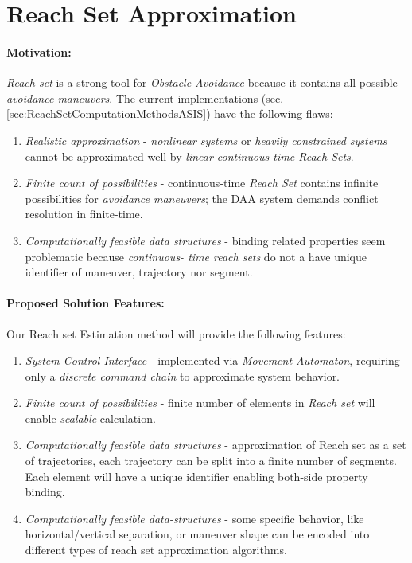 \cleardoublepage
\section{Reach Set Approximation}\label{s:reachSet}

    \noindent\paragraph{Motivation:} \emph{Reach set} is a strong tool for \emph{Obstacle Avoidance} because it contains all possible \emph{avoidance maneuvers}. The current implementations (sec. \ref{sec:ReachSetComputationMethodsASIS}) have the following flaws:
    
    \begin{enumerate}
        \item \emph{Realistic approximation} - \emph{nonlinear systems} or \emph{heavily constrained systems} cannot be approximated well by \emph{linear continuous-time Reach Sets}.
        
        \item \emph{Finite count of possibilities} - continuous-time \emph{Reach Set} contains  infinite possibilities for \emph{avoidance maneuvers}; the DAA system demands conflict resolution in finite-time.
        
        \item \emph{Computationally feasible data structures} - binding related properties seem problematic because \emph{continuous- time reach sets} do not a have unique identifier of maneuver, trajectory nor segment. 
    \end{enumerate}
    
    \paragraph{Proposed Solution Features:} Our Reach set Estimation method will provide the following features:
    
    \begin{enumerate}
        \item \emph{System Control Interface} - implemented via \emph{Movement Automaton}, requiring only a \emph{discrete command chain} to approximate system behavior.
        
        \item \emph{Finite count of possibilities} - finite number of elements in \emph{Reach set} will enable \emph{scalable} calculation.
        
        \item \emph{Computationally feasible data structures} - approximation of Reach set as a set of trajectories, each trajectory can be split into a finite number of segments. Each element will have a unique identifier enabling both-side  property binding.
        
        \item \emph{Computationally feasible data-structures} - some specific behavior, like horizontal/vertical separation, or maneuver shape can be encoded into  different types of reach set approximation algorithms.
    \end{enumerate}
